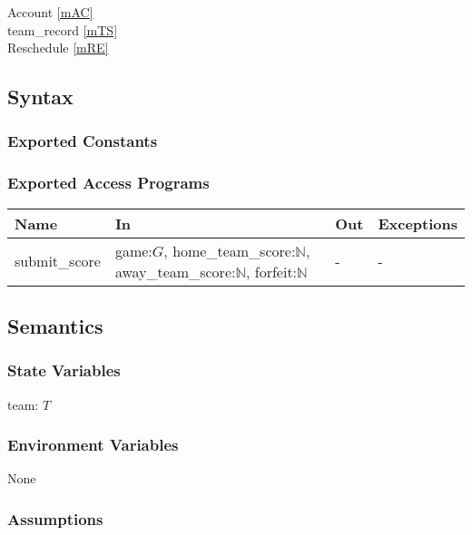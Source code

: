 \documentclass[12pt, titlepage]{article}
\begin{document}
Account \ref{mAC} \\
team\_record \ref{mTS} \\
Reschedule \ref{mRE}

\subsection{Syntax}

\subsubsection{Exported Constants}

\subsubsection{Exported Access Programs}

\begin{center}
\begin{tabular}{p{3cm} p{7cm} p{2cm} p{2cm}}
\hline
\textbf{Name} & \textbf{In} & \textbf{Out} & \textbf{Exceptions} \\
\hline
submit\_score & game:$G$, home\_team\_score:$\mathbb{N}$, away\_team\_score:$\mathbb{N}$, forfeit:$\mathbb{N}$ & - & - \\
\hline
\end{tabular}
\end{center}

\subsection{Semantics}

\subsubsection{State Variables}

team: $T$

\subsubsection{Environment Variables}

None

\subsubsection{Assumptions}

\end{document}
